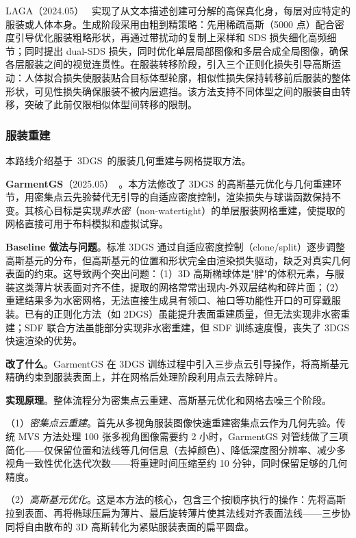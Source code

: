 LAGA（2024.05）~\cite{2405_12663} 实现了从文本描述创建可分解的高保真化身，每层对应特定的服装或人体本身。生成阶段采用由粗到精策略：先用稀疏高斯（5000 点）配合密度引导优化服装粗略形状，再通过带扰动的复制上采样和 SDS 损失细化高频细节；同时提出 dual-SDS 损失，同时优化单层局部图像和多层合成全局图像，确保各层服装之间的视觉连贯性。在服装转移阶段，引入三个正则化损失引导高斯运动：人体拟合损失使服装贴合目标体型轮廓，相似性损失保持转移前后服装的整体形状，可见性损失确保服装不被内层遮挡。该方法支持不同体型之间的服装自由转移，突破了此前仅限相似体型间转移的限制。

\subsubsection{服装重建}

本路线介绍基于~3DGS~的服装几何重建与网格提取方法。

\textbf{GarmentGS}（2025.05）~\cite{2505_02126}。本方法修改了 3DGS 的高斯基元优化与几何重建环节，用密集点云先验替代无引导的自适应密度控制，渲染损失与球谐函数保持不变。其核心目标是实现\emph{非水密}（non-watertight）的单层服装网格重建，使提取的网格直接可用于布料模拟和虚拟试穿。

\textbf{Baseline 做法与问题}。标准 3DGS 通过自适应密度控制（clone/split）逐步调整高斯基元的分布，但高斯基元的位置和形状完全由渲染损失驱动，缺乏对真实几何表面的约束。这导致两个突出问题：（1）3D 高斯椭球体是"胖"的体积元素，与服装这类薄片状表面对齐不佳，提取的网格常常出现内-外双层结构和碎片面；（2）重建结果多为水密网格，无法直接生成具有领口、袖口等功能性开口的可穿戴服装。已有的正则化方法（如 2DGS）虽能提升表面重建质量，但无法实现非水密重建；SDF 联合方法虽能部分实现非水密重建，但 SDF 训练速度慢，丧失了 3DGS 快速渲染的优势。

\textbf{改了什么}。GarmentGS 在 3DGS 训练过程中引入三步点云引导操作，将高斯基元精确约束到服装表面上，并在网格后处理阶段利用点云去除碎片。

\textbf{实现原理}。整体流程分为密集点云重建、高斯基元优化和网格去噪三个阶段。

（1）\emph{密集点云重建}。首先从多视角服装图像快速重建密集点云作为几何先验。传统 MVS 方法处理 100 张多视角图像需要约 2 小时，GarmentGS 对管线做了三项简化——仅保留位置和法线等几何信息（去掉颜色）、降低深度图分辨率、减少多视角一致性优化迭代次数——将重建时间压缩至约 10 分钟，同时保留足够的几何精度。

（2）\emph{高斯基元优化}。这是本方法的核心，包含三个按顺序执行的操作：先将高斯拉到表面、再将椭球压扁为薄片、最后旋转薄片使其法线对齐表面法线——三步协同将自由散布的 3D 高斯转化为紧贴服装表面的扁平圆盘。

